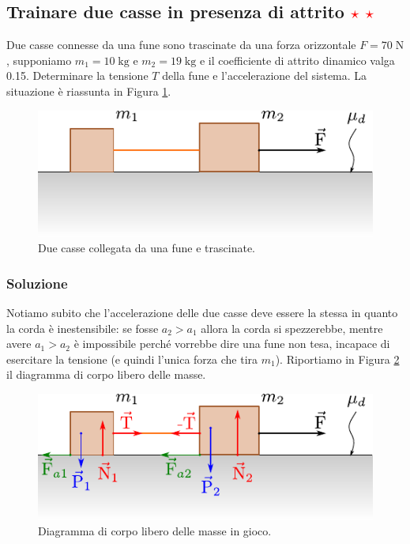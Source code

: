 \documentclass[12pt,a4paper]{book}
\newcommand{\rstar}{ \textcolor{red}{$\star$}}
\begin{document}
\subsection{Trainare due casse in presenza di attrito \rstar \rstar}
Due casse connesse da una fune sono trascinate da una forza  orizzontale $F=70\;\text{N}$, supponiamo $m_1=10\;\text{kg}$ e $m_2=19\;\text{kg}$ e il coefficiente di attrito dinamico valga 0.15. Determinare la tensione $T$ della fune e l'accelerazione del sistema. La situazione è riassunta in Figura \ref{fig:4-p-4-1}.

\begin{figure}[!ht]
\centering
\includegraphics[scale=1]{p-4-1.pdf}
\caption{Due casse collegata da una fune e trascinate.} 
\label{fig:4-p-4-1} 
\end{figure}

\subsubsection*{Soluzione}
Notiamo subito che l'accelerazione delle due casse deve essere la stessa in quanto la corda è inestensibile: se fosse $a_2>a_1$ allora la corda si spezzerebbe, mentre avere $a_1>a_2$ è impossibile perché vorrebbe dire una fune non tesa, incapace di esercitare la tensione (e quindi l'unica forza che tira $m_1$). Riportiamo in Figura \ref{fig:4-p-4-2} il diagramma di corpo libero delle masse.

\begin{figure}[!ht]
\centering
\includegraphics[scale=1]{p-4-2.pdf}
\caption{Diagramma di corpo libero delle masse in gioco.} 
\label{fig:4-p-4-2} 
\end{figure}
\end{document}
